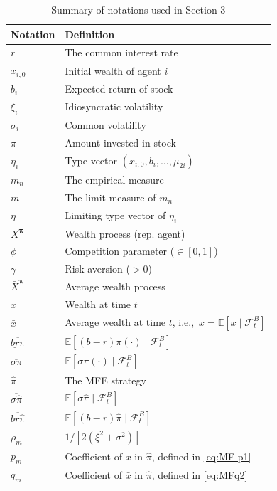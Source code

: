 \documentclass[11pt]{article}
\newenvironment{bluepar}
{\begingroup\color{blue}}
{\endgroup}
\numberwithin{equation}{section}
\begin{document}
\begin{bluepar}
\begin{table}[htbp]
	\centering
	\caption{Summary of notations used in Section 3}
	\label{tab:notation2}
	\renewcommand{\arraystretch}{1.3}
	\begin{tabular}{l l}
		\toprule
		\textbf{Notation} & \textbf{Definition} \\
		\midrule
		$r$ & The common interest rate \\
		$x_{i,0}$ & Initial wealth of agent $i$ \\
		$b_i$ & Expected return of stock \\
		$\xi_i$ & Idiosyncratic volatility \\
		$\sigma_i$ & Common volatility \\
		$\pi$ & Amount invested in stock \\
		$\eta_i$ & Type vector $(x_{i,0}, b_i, \dots, \mu_{2i})$ \\
		$m_n$ & The empirical measure \\
		$m$ & The limit measure of $m_n$ \\
		$\eta$ & Limiting type vector of $\eta_i$ \\
		$X^{\bm{\pi}}$ & Wealth process (rep. agent) \\
		$\phi$ & Competition parameter ($\in[0,1]$) \\
		$\gamma$ & Risk aversion ($>0$) \\
		$\bar{X}^{\bm{\pi}}$ & Average wealth process \\
		$x$ & Wealth at time $t$ \\
		$\bar{x}$ & Average wealth at time $t$, i.e.,\ $\bar{x}=\mathbb{E}[x\mid \mathcal{F}_t^B]$ \\
		$\overline{\underline{br}\pi}$ & $\mathbb{E}[(b-r)\pi(\cdot)\mid \mathcal{F}_t^B]$ \\
		$\overline{\sigma\pi}$ & $\mathbb{E}[\sigma\pi(\cdot)\mid \mathcal{F}_t^B]$ \\
		$\widehat{\pi}$ & The MFE strategy \\
		$\overline{\sigma\widehat{\pi}}$ & $\mathbb{E}[\sigma\widehat{\pi}\mid \mathcal{F}_t^B]$ \\
		$\overline{\underline{br}\widehat{\pi}}$ & $\mathbb{E}[(b-r)\widehat{\pi}\mid \mathcal{F}_t^B]$ \\
		$\rho_{\scriptscriptstyle m}$ & $1/[2(\xi^2+\sigma^2)]$ \\
		$p_{\scriptscriptstyle m}$ & Coefficient of $x$ in $\widehat{\pi}$, defined in \eqref{eq:MF-p1} \\
		$q_{\scriptscriptstyle m}$ & Coefficient of $\bar{x}$ in $\widehat{\pi}$, defined in \eqref{eq:MFq2} \\

\end{tabular}
\end{table}
\end{bluepar}
\end{document}

